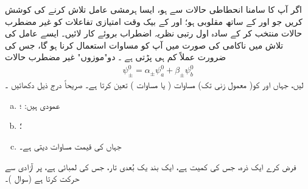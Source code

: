    اگر آپ کا سامنا انحطاطی حالات سے ہو،  ایسا ہرمشی عامل  تلاش کرنے کی کوشش کریں جو  اور  کے ساتھ  مقلوبی  ہو؛   اور  کے بیک وقت امتیازی تفاعلات کو  غیر مضطرب حالات منتخب کر کے سادہ اول رتبی نظریہ اضطراب بروئے کار لائیں۔ ایسے عامل کی  تلاش  میں ناکامی  کی صورت میں آپ کو مساوات   استعمال کرنا ہو گا،  جس کی ضرورت عملاً  کم ہی پڑتی ہے ۔
  دو"موزوں" غیر مضطرب حالات
\begin{align*}
\psi_\pm^0 = \alpha_\pm \psi_a^0 + \beta_\pm \psi_b^0
\end{align*}
لیں، جہاں  اور  کو( معمول زنی  تک)  مساوات  (  یا مساوات )   تعین کرتا ہے۔   صریحاً  درج ذیل دکھائیں ۔
\begin{enumerate}[a.]
\item
{} عمودی ہیں:    ؛
\item
{} ؛
\item
{} جہاں  کی قیمت مساوات  دیتی ہے۔ 
\end{enumerate}
فرض کرے ایک ذرہ،  جس کی کمیت  ہے،  ایک  بند یک بُعدی تار،  جس کی لمبائی  ہے،  پر آزادی سے حرکت کرتا ہے (سوال )۔ 
